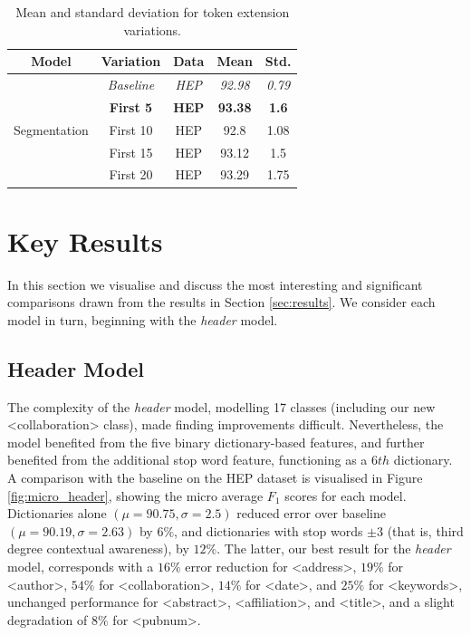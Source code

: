 \begin{table}[h]
\begin{center}
\begin{tabular}{|c|c|c|c|c|}
\hline
Model & Variation & Data & Mean & Std.\\
\hline
\multirow{5}{*}{Segmentation} & \emph{Baseline} & \emph{HEP} & \emph{92.98} & \emph{0.79} \\\cline{2-5}
& \textbf{First 5} & \textbf{HEP} & \textbf{93.38} & \textbf{1.6}\\\cline{2-5}
& First 10 & HEP & 92.8 & 1.08\\\cline{2-5}
& First 15 & HEP & 93.12 & 1.5\\\cline{2-5}
& First 20 & HEP & 93.29 & 1.75\\\cline{2-5}
\hline
\end{tabular}
\caption{Mean and standard deviation for token extension variations.}
\label{table:tokenextensions}
\end{center}
\end{table}

\section{Key Results}
\label{sec:keyresults}

In this section we visualise and discuss the most interesting and significant comparisons drawn from the results in Section \ref{sec:results}. We consider each model in turn, beginning with the \emph{header} model.

\subsection{Header Model}

The complexity of the \emph{header} model, modelling 17 classes (including our new <collaboration> class), made finding improvements difficult. Nevertheless, the model benefited from the five binary dictionary-based features, and further benefited from the additional stop word feature, functioning as a $6th$ dictionary. A comparison with the baseline on the HEP dataset is visualised in Figure \ref{fig:micro_header}, showing the micro average $F_1$ scores for each model. Dictionaries alone $(\mu = 90.75, \sigma = 2.5)$ reduced error over baseline $(\mu = 90.19, \sigma = 2.63)$ by $6\%$, and dictionaries with stop words $\pm 3$ (that is, third degree contextual awareness), by $12\%$. The latter, our best result for the \emph{header} model, corresponds with a $16\%$ error reduction for <address>, $19\%$ for <author>, $54\%$ for <collaboration>, $14\%$ for <date>, and $25\%$ for <keywords>, unchanged performance for <abstract>, <affiliation>, and <title>, and a slight degradation of $8\%$ for <pubnum>.

